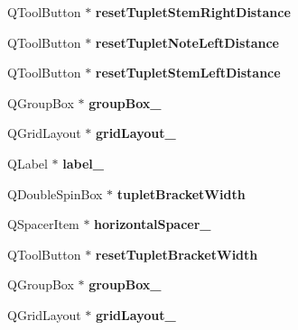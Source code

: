 \begin{DoxyCompactItemize}
Q\+Tool\+Button $\ast$ {\bfseries reset\+Tuplet\+Stem\+Right\+Distance}
\item 
\mbox{\label{class_ui___edit_style_base_af2674bb8daaffe15275062d5e0843241}} 
Q\+Tool\+Button $\ast$ {\bfseries reset\+Tuplet\+Note\+Left\+Distance}
\item 
\mbox{\label{class_ui___edit_style_base_a71f223a22ba87a01422558425a175e7e}} 
Q\+Tool\+Button $\ast$ {\bfseries reset\+Tuplet\+Stem\+Left\+Distance}
\item 
\mbox{\label{class_ui___edit_style_base_a41bf14a25cb4407143ed8aca4b564c4f}} 
Q\+Group\+Box $\ast$ {\bfseries group\+Box\+\_}
\item 
\mbox{\label{class_ui___edit_style_base_ae5ee49a0c89575569f7e225e17b52cbc}} 
Q\+Grid\+Layout $\ast$ {\bfseries grid\+Layout\+\_}
\item 
\mbox{\label{class_ui___edit_style_base_ac5bef28a5adf76fe5abfb5f3673c08c4}} 
Q\+Label $\ast$ {\bfseries label\+\_}
\item 
\mbox{\label{class_ui___edit_style_base_aeda4d1222fcda73ba16dbaeeb220649c}} 
Q\+Double\+Spin\+Box $\ast$ {\bfseries tuplet\+Bracket\+Width}
\item 
\mbox{\label{class_ui___edit_style_base_aa5fbd2b80a224a1cc4081b0ac3cb1bff}} 
Q\+Spacer\+Item $\ast$ {\bfseries horizontal\+Spacer\+\_}
\item 
\mbox{\label{class_ui___edit_style_base_a2a1afebe0564cd49d94799f96b23938d}} 
Q\+Tool\+Button $\ast$ {\bfseries reset\+Tuplet\+Bracket\+Width}
\item 
\mbox{\label{class_ui___edit_style_base_a3cc7ac492721c01c37b04bcb35e960f3}} 
Q\+Group\+Box $\ast$ {\bfseries group\+Box\+\_}
\item 
\mbox{\label{class_ui___edit_style_base_ab0edd1d6260bcaffde96386626519678}} 
Q\+Grid\+Layout $\ast$ {\bfseries grid\+Layout\+\_}

\end{DoxyCompactItemize}
